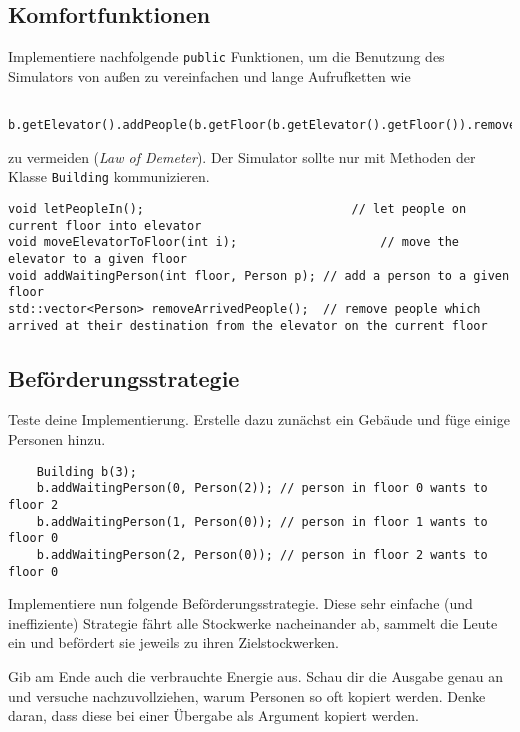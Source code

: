 \subsection{Komfortfunktionen}
Implementiere nachfolgende \texttt{public} Funktionen, um die Benutzung des Simulators von außen zu vereinfachen und lange Aufrufketten wie
\begin{lstlisting}
	b.getElevator().addPeople(b.getFloor(b.getElevator().getFloor()).removeAllPeople());
\end{lstlisting}

zu vermeiden (\emph{Law of Demeter}).
Der Simulator sollte nur mit Methoden der Klasse \texttt{Building} kommunizieren.

\begin{lstlisting}
void letPeopleIn();								// let people on current floor into elevator
void moveElevatorToFloor(int i);					// move the elevator to a given floor
void addWaitingPerson(int floor, Person p);	// add a person to a given floor
std::vector<Person> removeArrivedPeople();	// remove people which arrived at their destination from the elevator on the current floor
\end{lstlisting}

\subsection{Beförderungsstrategie}
Teste deine Implementierung.
Erstelle dazu zunächst ein Gebäude und füge einige Personen hinzu.

\begin{lstlisting}
	Building b(3);
	b.addWaitingPerson(0, Person(2)); // person in floor 0 wants to floor 2
	b.addWaitingPerson(1, Person(0)); // person in floor 1 wants to floor 0
	b.addWaitingPerson(2, Person(0)); // person in floor 2 wants to floor 0
\end{lstlisting}

Implementiere nun folgende Beförderungsstrategie.
Diese sehr einfache (und ineffiziente) Strategie fährt alle Stockwerke nacheinander ab, sammelt die Leute ein und befördert sie jeweils zu ihren Zielstockwerken.

\begin{algorithm}[H]
 \SetAlgoLined
\end{algorithm}

Gib am Ende auch die verbrauchte Energie aus.
Schau dir die Ausgabe genau an und versuche nachzuvollziehen, warum Personen so oft kopiert werden.
Denke daran, dass diese bei einer Übergabe als Argument kopiert werden.




